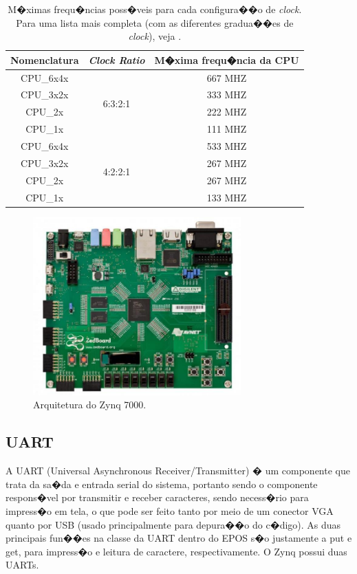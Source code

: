 \documentclass{ufscThesis/ufscThesis} %
\begin{document}
\begin{table}[ht]
	\centering
	\begin{tabular}{ccc}
		\hline\hline
		Nomenclatura & \emph{Clock Ratio} & M�xima frequ�ncia da CPU\\[0.5ex]
		\hline
		CPU\_6x4x & \multirow{4}{*}{6:3:2:1} & 667 MHZ\\
		CPU\_3x2x &                          & 333 MHZ\\
		CPU\_2x   &                          & 222 MHZ\\
		CPU\_1x   &                          & 111 MHZ\\
		\hline
		CPU\_6x4x & \multirow{4}{*}{4:2:2:1} & 533 MHZ\\
		CPU\_3x2x &                          & 267 MHZ\\
		CPU\_2x   &                          & 267 MHZ\\
		CPU\_1x   &                          & 133 MHZ\\[1ex]
		\hline
	\end{tabular}
	\caption{M�ximas frequ�ncias poss�veis para cada configura��o de \emph{clock}. Para uma lista mais completa (com as diferentes gradua��es de \emph{clock}), veja \cite[p.~13]{data_sheet}.}
	\label{tab:clocks}
\end{table}

\begin{figure}[ht!]
    \centering
    \includegraphics[width=8cm]{figuras/zedboard}
	\caption{Arquitetura do Zynq 7000.}
\end{figure}

\subsection{UART}
A UART (Universal Asynchronous Receiver/Transmitter) � um componente que trata da sa�da e entrada serial do sistema, portanto sendo o componente respons�vel por transmitir e receber caracteres, sendo necess�rio para impress�o em tela, o que pode ser feito tanto por meio de um conector VGA quanto por USB (usado principalmente para depura��o do c�digo). As duas principais fun��es na classe da UART dentro do EPOS s�o justamente a put e get, para impress�o e leitura de caractere, respectivamente. O Zynq possui duas UARTs.
\end{document}
